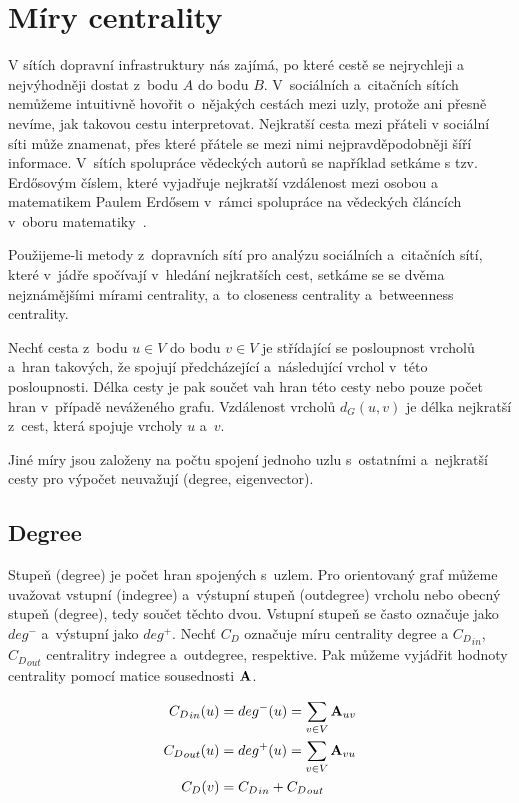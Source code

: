 \documentclass{bakalarka}
\begin{document}
\section{Míry centrality}
V sítích dopravní infrastruktury nás zajímá, po které cestě se nejrychleji a
nejvýhodněji dostat z~bodu $A$ do bodu $B$. V~sociálních a~citačních sítích
nemůžeme intuitivně hovořit o~nějakých cestách mezi uzly, protože ani přesně
nevíme, jak takovou cestu interpretovat. Nejkratší cesta mezi přáteli v
sociální síti může znamenat, přes které přátele se mezi nimi nejpravděpodobněji
šíří informace. V~sítích spolupráce vědeckých autorů se například setkáme s
tzv. Erdősovým číslem, které vyjadřuje nejkratší vzdálenost mezi osobou a
matematikem Paulem Erdősem v~rámci spolupráce na vědeckých článcích v~oboru
matematiky~\citep{barabasi2005}.

Použijeme-li metody z~dopravních sítí pro analýzu sociálních a~citačních sítí,
které v~jádře spočívají v~hledání nejkratších cest, setkáme se se dvěma
nejznámějšími mírami centrality, a~to closeness centrality a~betweenness
centrality.

Nechť cesta z~bodu $u \in V$ do bodu $v \in V$ je střídající se posloupnost
vrcholů a~hran takových, že spojují předcházející a~následující vrchol v~této
posloupnosti. Délka cesty je pak součet vah hran této cesty nebo pouze počet
hran v~případě neváženého grafu. Vzdálenost vrcholů $d_G(u, v)$ je délka
nejkratší z~cest, která spojuje vrcholy $u$ a~$v$.

Jiné míry jsou založeny na počtu spojení jednoho uzlu s~ostatními a~nejkratší
cesty pro výpočet neuvažují (degree, eigenvector).


\subsection{Degree}
Stupeň (degree) je počet hran spojených s~uzlem. Pro orientovaný graf můžeme
uvažovat vstupní (indegree) a~výstupní stupeň (outdegree) vrcholu nebo obecný
stupeň (degree), tedy součet těchto dvou. Vstupní stupeň se často označuje jako
$deg^-$ a~výstupní jako $deg^+$. Nechť $C_D$ označuje míru centrality degree a
${C_D}_{in}$, ${C_D}_{out}$ centralitry indegree a~outdegree, respektive. Pak
můžeme vyjádřit hodnoty centrality pomocí matice sousednosti ${\bf A}$.

\begin{align*}
{C_D}_{in}(u) &= deg^-(u)  = \displaystyle\sum\limits_{v \in V} {\bf A}_{uv} \\
{C_D}_{out}(u) &= deg^+(u) = \displaystyle\sum\limits_{v \in V} {\bf A}_{vu} \\
{C_D}(v) &= {C_D}_{in} + {C_D}_{out}
\end{align*}
\end{document}
